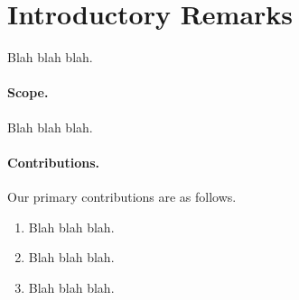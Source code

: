 \section{Introductory Remarks}

Blah blah blah.

 

\paragraph{Scope.} 
Blah blah blah.


\paragraph{Contributions.} 
Our primary contributions are as follows.

\begin{enumerate}

\item Blah blah blah.

\item Blah blah blah. 

\item Blah blah blah. 

\end{enumerate}

